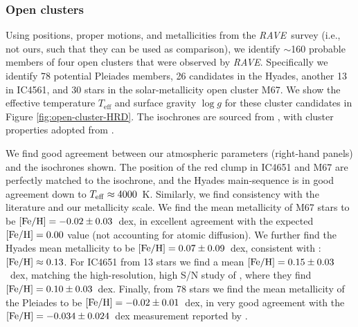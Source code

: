 \documentclass[preprint]{aastex}
\newcommand{\acronym}[1]{{\small{#1}}}
\newcommand{\project}[1]{\textsl{#1}}
\newcommand{\rave}{\project{\acronym{RAVE}}}
\newcommand{\teff}{T_{\mathrm{eff}}}
\newcommand{\logg}{\log g}
\begin{document}
\subsubsection{Open clusters}
\label{sec:open-cluster-validation}


Using positions, proper motions, and metallicities from the \rave\ survey
(i.e., not ours, such that they can be used as comparison), we identify $\sim$160 
probable members of four open clusters that were observed by \rave.
Specifically we identify 78 potential Pleiades members, 26 candidates in the
Hyades, another 13 in IC4561, and 30 stars in the solar-metallicity open
cluster M67.
We show the effective temperature $\teff$ and surface gravity $\logg$ for these
cluster candidates in Figure \ref{fig:open-cluster-HRD}.  The isochrones are 
sourced from \citet{Bressan_2012}, with cluster properties adopted from 
\cite{Kharchenko_2013}.  




We find good agreement between our atmospheric parameters (right-hand panels) and the 
isochrones shown.  The position of the red clump in IC4651 and M67 are perfectly matched
to the isochrone, and the Hyades main-sequence is in good agreement down to 
$T_{\rm eff} \approx 4000$~K.  Similarly, we find consistency with the literature and
our metallicity scale.  We find the mean metallicity of M67 stars to be 
$[{\rm Fe/H}] = -0.02 \pm 0.03$~dex, in excellent agreement with the expected 
$[{\rm Fe/H}] = 0.00$ value (not accounting for atomic diffusion).
We further find the Hyades mean metallicity to be $[{\rm Fe/H}] = 0.07 \pm 0.09$~dex,
consistent with \citet{Paulson_2003}: $[{\rm Fe/H}] \approx 0.13$.
For IC4651 from 13 stars we find a mean $[{\rm Fe/H}] = 0.15 \pm 0.03$~dex, matching the
high-resolution, high S/N study of \citet{Pasquini_2004}, where they find 
$[{\rm Fe/H}] = 0.10 \pm 0.03$~dex. Finally, from 78 stars we find the mean
metallicity of the Pleiades to be $[{\rm Fe/H}] = -0.02 \pm 0.01$~dex, in very 
good agreement with the $[{\rm Fe/H}] = -0.034 \pm 0.024$~dex measurement reported by 
\citet{Friel_Boesgaard_1990}.
\end{document}
